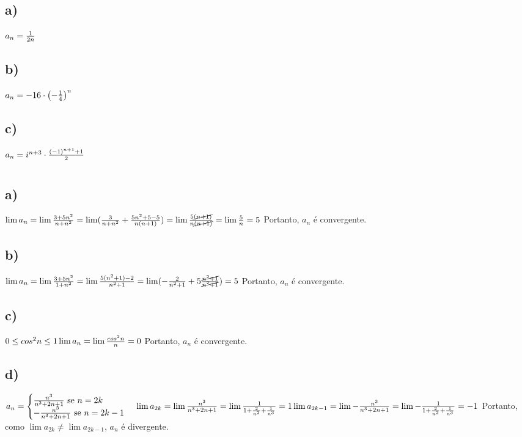 \documentclass{article}
\begin{document}
\subsection*{a)}
$a_n = \frac{1}{2n}\\$

\subsection*{b)}
$a_n = -16 \cdot \left(-\frac{1}{4}\right)^n\\$

\subsection*{c)}
$a_n = i^{n+3} \cdot \frac{(-1)^{n + 1}+ 1}{2}\\$

\section{}

\subsection*{a)}
$\lim a_n = \lim \frac{3+5n^2}{n+n^2} = \lim (\frac{3}{n+n^2} + \frac{5n^2 + 5 - 5}{n(n+1)}) = \lim \frac{5\cancel{(n+1)}}{n\cancel{(n+1)}} = \lim \frac{5}{n} = 5 \\$
Portanto, $a_n$ é convergente.

\subsection*{b)}
$\lim a_n = \lim \frac{3+5n^2}{1+n^2} = \lim \frac{5(n^2 + 1) - 2}{n^2 + 1} = \lim (-\frac{2}{n^2+1} + 5\frac{\cancel{n^2+1}}{\cancel{n^2+1}}) = 5\\$
Portanto, $a_n$ é convergente.

\subsection*{c)}
$0 \leq cos^2{n} \leq 1 \\
\lim a_n = \lim \frac{cos^2{n}}{n} = 0\\$ 
Portanto, $a_n$ é convergente.

\subsection*{d)}
$a_n = 
\begin{cases}
    \frac{n^3}{n^3 + 2n +1} \text{ se $n = 2k$}\\
    -\frac{n^3}{n^3 + 2n +1} \text{ se $n = 2k -1$}
\end{cases}\\
\lim a_{2k} = \lim \frac{n^3}{n^3 + 2n + 1} = \lim \frac{1}{1 + \frac{2}{n^2} + \frac{1}{n^3}} = 1\\
\lim a_{2k-1} = \lim -\frac{n^3}{n^3 + 2n + 1} = \lim -\frac{1}{1 + \frac{2}{n^2} + \frac{1}{n^3}} = -1\\$
Portanto, como $\lim a_{2k} \neq \lim a_{2k-1} $, $a_n$ é divergente.
\end{document}
